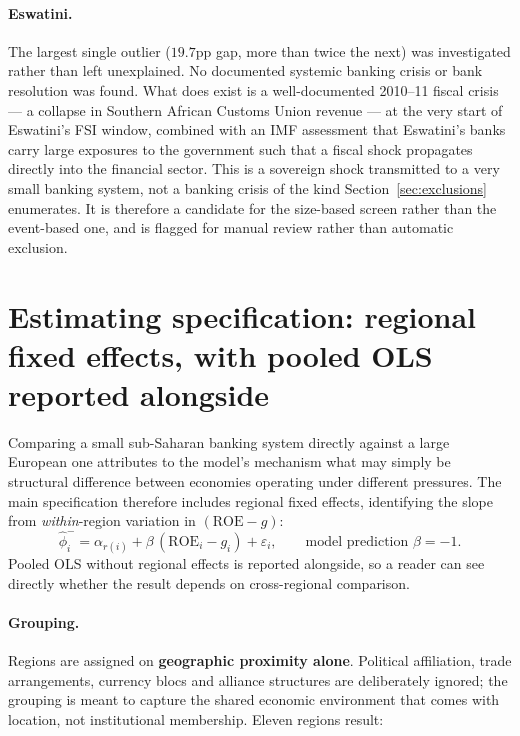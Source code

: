 \documentclass[11pt]{article}
\begin{document}
\paragraph{Eswatini.} The largest single outlier ($19.7$pp gap, more than
twice the next) was investigated rather than left unexplained. No
documented systemic banking crisis or bank resolution was found. What does
exist is a well-documented 2010--11 fiscal crisis --- a collapse in
Southern African Customs Union revenue --- at the very start of Eswatini's
FSI window, combined with an IMF assessment that Eswatini's banks carry
large exposures to the government such that a fiscal shock propagates
directly into the financial sector. This is a sovereign shock transmitted
to a very small banking system, not a banking crisis of the kind
Section~\ref{sec:exclusions} enumerates. It is therefore a candidate for
the size-based screen rather than the event-based one, and is flagged for
manual review rather than automatic exclusion.


\section{Estimating specification: regional fixed effects, with pooled OLS
reported alongside}
\label{sec:spec}

Comparing a small sub-Saharan banking system directly against a large
European one attributes to the model's mechanism what may simply be
structural difference between economies operating under different
pressures. The main specification therefore includes regional fixed
effects, identifying the slope from \emph{within}-region variation in
$(\mathrm{ROE}-g)$:
\[
  \hat\phi^-_i = \alpha_{r(i)} + \beta\,(\mathrm{ROE}_i - g_i)
  + \varepsilon_i,
  \qquad \text{model prediction } \beta = -1 .
\]
Pooled OLS without regional effects is reported alongside, so a reader can
see directly whether the result depends on cross-regional comparison.

\paragraph{Grouping.} Regions are assigned on \textbf{geographic proximity
alone}. Political affiliation, trade arrangements, currency blocs and
alliance structures are deliberately ignored; the grouping is meant to
capture the shared economic environment that comes with location, not
institutional membership. Eleven regions result:
\end{document}
